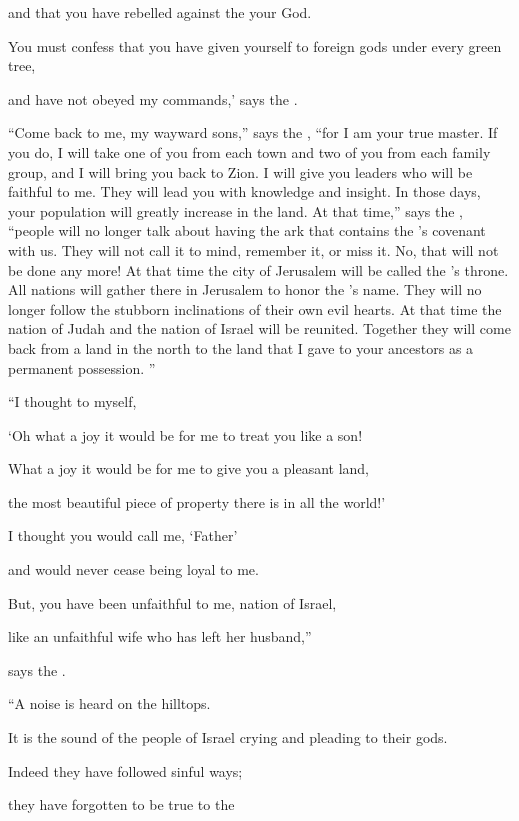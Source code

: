 {\par }{\Q and that
you have rebelled
against the
{}
your God.
\par }{\Q You must
confess
that you have given yourself
to foreign
gods under
every
green
tree,
\par }{\Q and have not
obeyed
my commands,’ says
the {}.
\par }{\PP {}“Come back
to me, my wayward
sons,”
says
the {}, “for
I am
your true
master. If you do, I will take
one
of you from each town
and two
of you from each family group,
and I will bring
you back to Zion.
I will give
you leaders
who will be faithful to me. They will lead you with knowledge and insight.
In those days,
your population
will greatly
increase
in the land.
At that time,”
says
the {}, “people
will no
longer
talk about having
the ark
that contains the
{}’s
covenant
with us.
They will not
call it to mind,
remember
it, or
miss
it. No, that will not
be done
any more!
At that time
the city of Jerusalem
will be called
the
{}’s
throne.
All
nations
will gather
there in
Jerusalem
to honor
the
{}’s
name. They will no
longer
follow
the stubborn inclinations
of their own evil
hearts.
At that time
the nation
of Judah
and the nation
of Israel
will be reunited.
Together
they
will come back
from a land
in the north
to the land
that
I gave
to your ancestors as a permanent possession. ”
\par }{\Q {}“I
thought
to myself,

\par }{\Q ‘Oh
what a joy
it would
be for me to treat
you like a son!

\par }{\Q What a joy
it would
be for me to give
you a pleasant
land,
\par }{\Q the most
beautiful
piece
of property
there is in all the world!’

\par }{\Q I thought
you would
call
me, ‘Father’
\par }{\Q and would never
cease being
loyal to me.
\par }{\Q {}But,
you have been unfaithful
to me, nation
of Israel,
\par }{\Q like an unfaithful
wife
who has left her husband,”
\par }{\Q says
the {}.
\par }{\Q {}“A noise
is heard
on
the hilltops.
\par }{\Q It is the sound of the people
of Israel
crying
and pleading
to their gods.
\par }{\Q Indeed
they have followed sinful
ways;
\par }{\Q they have forgotten
to be true to the

}
